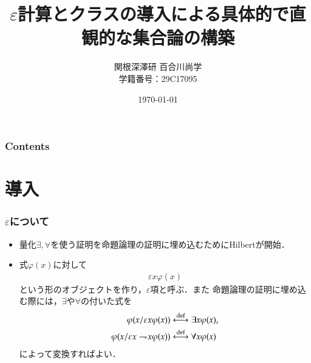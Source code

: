 \documentclass[dvipdfmx,10pt,notheorems]{beamer}
\title{$\varepsilon$計算とクラスの導入による具体的で直観的な集合論の構築}%
\author{関根深澤研 百合川尚学 \\ 学籍番号：29C17095}%
\institute{}%
\date{\today}%
\theoremstyle{definition}
\newcommand{\defarrow}{\overset{\mathrm{def}}{\longleftrightarrow}} %
\newcommand{\negation}{\rightharpoondown\hspace{-0.25em}} %
\begin{document}

\begin{frame}[plain]\frametitle{}
\titlepage %
\end{frame}

\begin{frame}\frametitle{Contents}
\tableofcontents %
\end{frame}

\section{導入}

\begin{frame}\frametitle{$\varepsilon$について}
	\begin{itemize}
		\item 量化$\exists,\forall$を使う証明を命題論理の証明に埋め込むためにHilbertが開始．
		
		\item 式$\varphi(x)$に対して
			\begin{align}
				\varepsilon x \varphi(x)
			\end{align}
			という形のオブジェクトを作り，$\varepsilon$項と呼ぶ．また
			命題論理の証明に埋め込む際には，$\exists$や$\forall$の付いた式を
			\begin{align}
				\varphi(x/\varepsilon x \varphi(x)) &\defarrow \exists x \varphi(x), \\
				\varphi(x/\varepsilon x \negation x \varphi(x)) &\defarrow \forall x \varphi(x)
			\end{align}
			によって変換すればよい．
	\end{itemize}
\end{frame}
\end{document}
